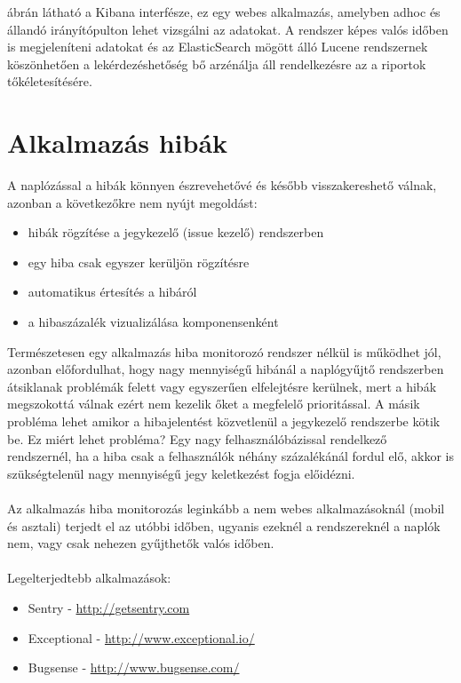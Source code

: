  ábrán látható a Kibana interfésze, ez egy webes alkalmazás, amelyben adhoc és állandó irányítópulton lehet vizsgálni az adatokat. A rendszer képes valós időben is megjeleníteni adatokat és az ElasticSearch mögött álló Lucene rendszernek köszönhetően a lekérdezéshetőség bő arzénálja áll rendelkezésre az a riportok tőkéletesítésére.

\section{Alkalmazás hibák\\}
A naplózással a hibák könnyen észrevehetővé és később visszakereshető válnak, azonban a következőkre nem nyújt megoldást:\\
\begin{itemize}
\item hibák rögzítése a jegykezelő (issue kezelő) rendszerben
\item egy hiba csak egyszer kerüljön rögzítésre
\item automatikus értesítés a hibáról
\item a hibaszázalék vizualizálása komponensenként
\end{itemize}

Természetesen egy alkalmazás hiba monitorozó rendszer nélkül is működhet jól, azonban előfordulhat, hogy nagy mennyiségű hibánál a naplógyűjtő rendszerben átsiklanak problémák felett vagy egyszerűen elfelejtésre kerülnek, mert a hibák megszokottá válnak ezért nem kezelik őket a megfelelő prioritással. A másik probléma lehet amikor a hibajelentést közvetlenül a jegykezelő rendszerbe kötik be. Ez miért lehet probléma? Egy nagy felhasználóbázissal rendelkező rendszernél, ha a hiba csak a felhasználók néhány százalékánál fordul elő, akkor is szükségtelenül nagy mennyiségű jegy keletkezést fogja előidézni.\\
\hfill\\
Az alkalmazás hiba monitorozás leginkább a nem webes alkalmazásoknál (mobil és asztali) terjedt el az utóbbi időben, ugyanis ezeknél a rendszereknél a naplók nem, vagy csak nehezen gyűjthetők valós időben.\\
\hfill\\
Legelterjedtebb alkalmazások:
\begin{itemize}
\item Sentry - \url{http://getsentry.com}
\item Exceptional - \url{http://www.exceptional.io/}
\item Bugsense - \url{http://www.bugsense.com/}
\end{itemize}

